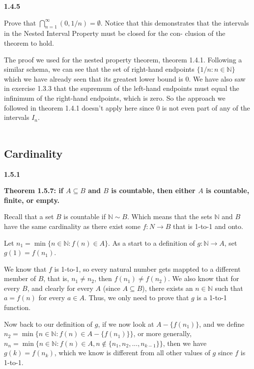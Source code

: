 \textbf{1.4.5}

Prove that $\bigcap^{\infty}_{n=1} (0, 1/n) = \emptyset$. 
Notice that this demonstrates that the intervals in the Nested Interval Property
must be closed for the con- clusion of the theorem to hold.

The proof we used for the nested property theorem, theorem 1.4.1.
Following a similar schema, we can see that the set of right-hand endpoints $\{ 1/n : n\in\mathbb{N} \}$ which we have
already seen that its greatest lower bound is 0.
We have also saw in exercise 1.3.3 that the supremum of the left-hand endpoints must equal the infinimum of the right-hand
endpoints, which is zero.
So the approach we followed in theorem 1.4.1 doesn't apply here since 0 is not even part of any of the intervals $I_n$.
\\~\\





\subsection{Cardinality}


\textbf{1.5.1}

\textbf{Theorem 1.5.7: if $A \subseteq B$ and $B$ is countable, then either $A$ is countable, finite, or empty.}

Recall that a set $B$ is countable if $\mathbb{N} \sim B$.
Which means that the sets $\mathbb{N}$ and $B$ have the same cardinality as there exist some $f : N \rightarrow B$
that is 1-to-1 and onto.

Let $n_1 = \min \{ n \in \mathbb{N} : f(n) \in A \}$.
As a start to a definition of $g: \mathbb{N} \rightarrow A$, set $g(1) = f(n_1)$.

We know that $f$ is 1-to-1, so every natural number gets mappted to a different member of $B$, that is, $n_1 \neq n_2$, then
$f(n_1) \neq f(n_2)$.
We also know that for every $B$, and clearly for every $A$ (since $A \subseteq B$), there exists an $n \in \mathbb{N}$
such that $a = f(n)$ for every $a \in A$.
Thus, we only need to prove that $g$ is a 1-to-1 function.

Now back to our definition of $g$, if we now look at $A - \{f(n_1)\}$, and we define
$n_2 = \min \{ n \in \mathbb{N} : f(n) \in A - \{f(n_1)\} \}$, or more generally,
$n_n = \min \{ n \in \mathbb{N} : f(n) \in A, n \notin \{n_1, n_2, ..., n_{k-1}\} \}$,
then we have $g(k) = f(n_k)$, which we know is different from all other values of $g$ since $f$ is 1-to-1.
\\~\\



